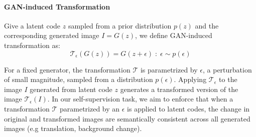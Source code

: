 \documentclass[10pt,twocolumn,letterpaper]{article}
\begin{document}
\vspace{-11pt}
\paragraph{GAN-induced Transformation}
Give a latent code $z$ sampled from a prior distribution $p(z)$ and the corresponding generated image $I = G(z)$, we define GAN-induced transformation as:
\begin{equation}
    \mathcal{T}_{\epsilon}(G(z)) = G(z+\epsilon) \; : \;\epsilon \sim p(\epsilon)
\end{equation}


For a fixed generator, the transformation $\mathcal{T}$ is parametrized by $\epsilon$, a perturbation of small magnitude, sampled from a distribution $p(\epsilon)$. Applying $\mathcal{T_{\epsilon}}$ to the image $I$ generated from latent code $z$ generates a transformed version of the image $\mathcal{T_{\epsilon}}(I)$. In our self-supervision task, we aim to enforce that when a transformation $\mathcal{T}$ parametrized by an $\epsilon$ is applied to latent codes, the change in original and transformed images are semantically consistent across all generated images (e.g translation, background change).







\vspace{-8pt}
\end{document}
